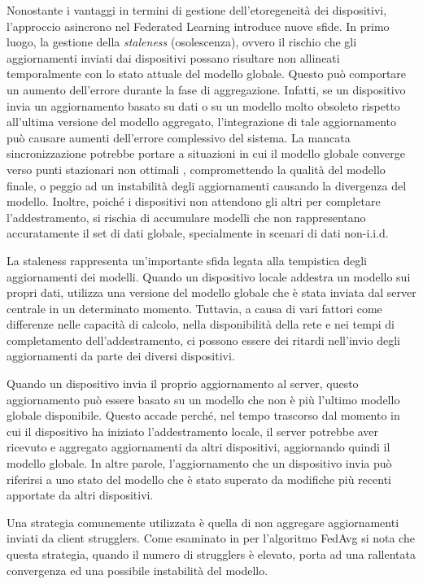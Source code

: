\documentclass[a4paper, oneside, openright]{report}
\begin{document}
Nonostante i vantaggi in termini di gestione dell'etoregeneità dei dispositivi, l'approccio asincrono nel Federated Learning introduce nuove sfide. 
In primo luogo, la gestione della \textit{staleness} (osolescenza), ovvero il rischio che gli aggiornamenti inviati dai dispositivi possano risultare non allineati temporalmente con lo stato attuale del modello globale. Questo può comportare un aumento dell'errore durante la fase di aggregazione. Infatti, se un dispositivo invia un aggiornamento basato su dati o su un modello molto obsoleto rispetto all’ultima versione del modello aggregato, l'integrazione di tale aggiornamento può causare aumenti dell'errore complessivo del sistema. 
La mancata sincronizzazione potrebbe portare a situazioni in cui il modello globale converge verso punti stazionari non ottimali \cite{DBLP:journals/corr/abs-2007-07481}, compromettendo la qualità del modello finale, o peggio ad un instabilità degli aggiornamenti causando la divergenza del modello.
Inoltre, poiché i dispositivi non attendono gli altri per completare l'addestramento, si rischia di accumulare modelli che non rappresentano accuratamente il set di dati globale, specialmente in scenari di dati non-i.i.d. 

La staleness rappresenta un'importante sfida legata alla tempistica degli aggiornamenti dei modelli. Quando un dispositivo locale addestra un modello sui propri dati, utilizza una versione del modello globale che è stata inviata dal server centrale in un determinato momento. Tuttavia, a causa di vari fattori come differenze nelle capacità di calcolo, nella disponibilità della rete e nei tempi di completamento dell'addestramento, ci possono essere dei ritardi nell'invio degli aggiornamenti da parte dei diversi dispositivi.

Quando un dispositivo invia il proprio aggiornamento al server, questo aggiornamento può essere basato su un modello che non è più l'ultimo modello globale disponibile. Questo accade perché, nel tempo trascorso dal momento in cui il dispositivo ha iniziato l'addestramento locale, il server potrebbe aver ricevuto e aggregato aggiornamenti da altri dispositivi, aggiornando quindi il modello globale. In altre parole, l'aggiornamento che un dispositivo invia può riferirsi a uno stato del modello che è stato superato da modifiche più recenti apportate da altri dispositivi.

Una strategia comunemente utilizzata è quella di non aggregare aggiornamenti inviati da client strugglers. Come esaminato in \cite{DBLP:journals/corr/abs-1812-06127} per l'algoritmo FedAvg si nota che questa strategia, quando il numero di strugglers è elevato, porta ad una rallentata convergenza ed una possibile instabilità del modello.
\end{document}
